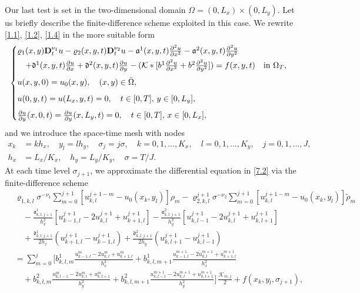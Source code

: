 \documentclass[reqno]{amsart}
\theoremstyle{definition}
\numberwithin{equation}{section}
\begin{document}
Our last test is set in the
two-dimensional domain $\Omega=(0,L_{x})\times(0,L_{y})$.
Let us briefly
describe the finite-difference scheme exploited in this case. We rewrite \eqref{1.1}, \eqref{1.2}, \eqref{1.4} in the more suitable form
\begin{equation}
\label{7.2}
\begin{cases}
\varrho_1(x,y)\mathbf{D}_{t}^{\nu_{1}}u -\varrho_{2}(x,y,t)\mathbf{D}_{t}^{\nu_2}u -\mathfrak{a}^{1}(x,y,t)\frac{\partial^{2} u}{\partial x^{2}}
-\mathfrak{a}^{2}(x,y,t)\frac{\partial^{2} u}{\partial y^{2}}
  \\
\noalign{\vskip1mm}
\quad+\mathfrak{d}^{1}(x,y,t)
\frac{\partial u}{\partial x}
+\mathfrak{d}^{2}(x,y,t)
\frac{\partial u}{\partial y}
-(\mathcal{K}*[ b^{1}\frac{\partial^{2} u}{\partial x^{2}}
+b^{2}\frac{\partial^{2} u}{\partial y^{2}}]) = f(x,y,t)\quad\text{in }\Omega_T,\\
\noalign{\vskip2mm}
u(x,y,0)=u_0(x,y),\quad (x,y)\in\bar{\Omega},\\
\noalign{\vskip2mm}
u(0,y,t)=u(L_x,y,t)=0, \quad t\in[0, T],\, y\in[0,L_y],\\
\noalign{\vskip2mm}
\frac{\partial u}{\partial y}(x,0,t)=\frac{\partial u}{\partial y}(x,L_y,t)=0, \quad t\in[0, T],\, x\in[0,L_x],
\end{cases}
\end{equation}
and we introduce the space-time mesh with nodes
\begin{align*}
x_{k}&=kh_x,\quad y_{l}=lh_y,\quad \sigma_{j}=j\sigma,\quad k=0,1,\ldots, K_x, \quad l=0,1,\ldots, K_y,
\quad j=0,1,\ldots,  J, \\
 h_x&= L_x/K_x, \quad h_y= L_y/K_y,
 \quad \sigma = T/J.
\end{align*}
At each time level $\sigma_{j+1}$,
we approximate the differential equation in \eqref{7.2} via the finite-difference scheme
\begin{align*}
& \varrho_{1,k,l} \sigma^{-\nu_{1}} \sum\limits_{m=0}^{j+1} [u^{j+1-m}_{k,l} - u_0(x_k,y_l)]\rho_m
- \varrho_{2,k,l}^{j+1} \sigma^{-\nu_2} \sum\limits_{m=0}^{j+1} [u^{j+1-m}_{k,l} - u_0(x_k,y_l)]\tilde\rho_m \\
& \quad- \frac{\mathfrak{a}^{1}_{k,l,j+1}}{h_{x}^2}[u^{j+1}_{k-1,l}-2u^{j+1}_{k,l}+u^{j+1}_{k+1,l}]
-\frac{\mathfrak{a}^{2}_{k,l,j+1}}{h_{y}^2}[u^{j+1}_{k,l-1}-2u^{j+1}_{k,l}+u^{j+1}_{k,l+1}]
\\
&
\quad+ \frac{  \mathfrak{d}^{1}_{k,l,j+1}}{2 h_x}(u^{j+1}_{k+1,l}-u^{j+1}_{k-1,l})
+ \frac{  \mathfrak{d}^{2}_{k,l,j+1}}{2 h_y}(u^{j+1}_{k,l+1}-u^{j+1}_{k,l-1})
\\
&
= \sum_{m=0}^{j}\bigg[b^{1}_{k,l,m} \frac{u^{m}_{k-1,l}-2 u^{m}_{k,l}+u^{m}_{k+1,l}}{h^2_{x}}
+ b^{1}_{k,l,m+1} \frac{u^{m+1}_{k-1,l}-2 u^{m+1}_{k,l}+u^{m+1}_{k+1,l}}{h_{x}^2}
\\&
\quad+b^2_{k,l,m} \frac{u^{m}_{k,l-1}-2 u^{m}_{k,l}+u^{m}_{k,l+1}}{h^2_{y}}
+
b^{2}_{k,l,m+1} \frac{u^{m+1}_{k,l-1}-2 u^{m+1}_{k,l}+u^{m+1}_{k,l+1}}{h_{y}^2}
\bigg]\,\frac{\mathcal{K}_{m,j}}{2}+f(x_k,y_{l},\sigma_{j+1}),
\end{align*}
\end{document}
